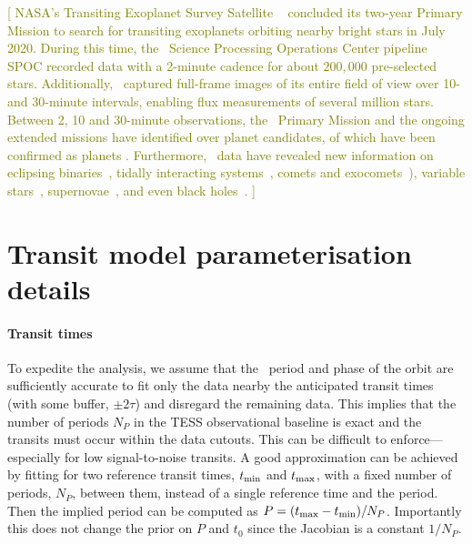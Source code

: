 
\textcolor{olive}{[
NASA's Transiting Exoplanet Survey Satellite \tess\ \citep{Ricker:2015:JATIS} concluded its two-year Primary Mission to search for transiting exoplanets orbiting nearby bright stars in July 2020.
During this time, the \tess\ Science Processing Operations Center pipeline SPOC \citep{Jenkins:2016:SPIE}  recorded data with a 2-minute cadence for about $200,000$ pre-selected stars.
Additionally, \tess\ captured full-frame images of its entire field of view over 10- and 30-minute intervals, enabling flux measurements of several million stars.
Between 2, 10 and 30-minute observations, the \tess\ Primary Mission and the ongoing extended missions have identified over \red{$\numTessCandidates$} planet candidates, \red{$\numTessPlanets$} of which have been confirmed as planets \citep{Stassun:2018:AJ, Stassun:2019:AJ, Guerrero:2021:ApJS, Guerrero:2021:AAS}. Furthermore, \tess\ data have revealed new information on eclipsing binaries~\citep{ Guo:2020:MNRAS, Powell:2021:AJ}, tidally interacting systems~\citet{Holoien:2019:ApJ}, comets and exocomets~\citep{Farnham:2019:ApJL, Zieba:2019:A&A, Kuznyetsova:2020:OAP, Woods:2021:PASP, Pavlenko:2021:KPCB}),  variable stars~\citet{Antoci:2019:MNRAS, Handler:2020:NatAs}, supernovae~\cite{Vallely:2021:MNRAS, Fausnaugh:2021:ApJ}, and even black holes~\cite{Jayasinghe:2021:MNRAS}.
]}






\section{Transit model parameterisation details}\label{apdx:model_details}

\paragraph{Transit times}
To expedite the analysis, we assume that the \exofop\ period and phase of the orbit are sufficiently accurate to fit only the data nearby the anticipated transit times (with some buffer, $\pm2\tau$) and disregard the remaining data.
This implies that the number of periods $N_P$ in the TESS observational baseline is exact and the transits must occur within the data cutouts.
This can be difficult to enforce---especially for low signal-to-noise transits.
A good approximation can be achieved by fitting for two reference transit times, $t_{\rm min}$ and $t_{\rm max}$, with a fixed number of periods, $N_P$, between them, instead of a single reference time and the period.
Then the implied period can be computed as $P = (t_{\rm max} - t_{\rm min}) / N_P$.
Importantly this does not change the prior on $P$ and $t_0$ since the Jacobian is a constant $1/N_P$.


